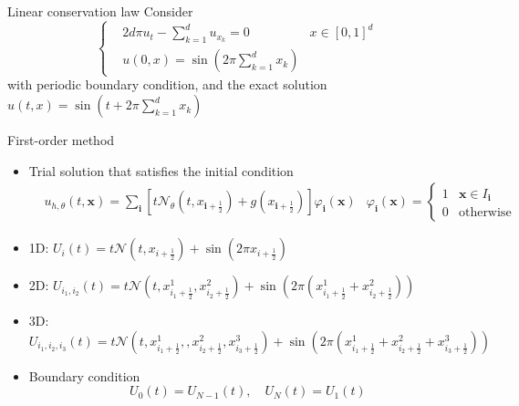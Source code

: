 \documentclass[aspectratio=169]{beamer}
\begin{document}
\begin{frame}{Linear conservation law}
 Consider 
 \begin{equation*}
 \left\{
 \begin{aligned}
 	 &2d\pi u_t - \sum_{k=1}^d u_{x_k} = 0 & x\in [0,1]^d\\
 	 &u(0,x) = \sin( 2 \pi \sum_{k=1}^d x_k)
 \end{aligned}\right.
 \end{equation*}
 with periodic boundary condition, and the exact solution  $u(t,x) = \sin(t + 2 \pi \sum_{k=1}^d x_k)$
  
\end{frame}
\begin{frame}{First-order method}
\begin{itemize}
	\item Trial solution that satisfies the initial condition
	\begin{equation*}
	\begin{aligned}
	&u_{h,\theta}(t,\boldsymbol{x}) = \sum_{\boldsymbol{i}} [t\mathcal{N}_\theta(t,x_{\boldsymbol{i}+\frac{1}{2}}) + g(x_{\boldsymbol{i}+\frac{1}{2}} )]\varphi_{\boldsymbol{i}}(\boldsymbol{x}) &
	\varphi_{\boldsymbol{i}}(\boldsymbol{x}) = \left\{\begin{matrix}
	1 & \boldsymbol{x} \in I_{\boldsymbol{i}}\\
	0 & \text{otherwise}
	\end{matrix}\right.
	\end{aligned}
	\end{equation*}
	\item 1D: $U_i(t) = t \mathcal{N}(t,x_{i+\frac{1}{2}}) + \sin(2\pi x_{i+\frac{1}{2}})$
	\item 2D: $U_{i_1,i_2}(t) = t \mathcal{N}(t,x^1_{i_1+\frac{1}{2}},x^2_{i_2+\frac{1}{2}}) + \sin(2\pi (x^1_{i_1+\frac{1}{2}}+x^2_{i_2+\frac{1}{2}} ) )$
	\item 3D: $U_{i_1,i_2,i_3}(t) = t \mathcal{N}(t,x^1_{i_1+\frac{1}{2}},,x^2_{i_2+\frac{1}{2}},x^3_{i_3+\frac{1}{2}}) + \sin(2\pi (x^1_{i_1+\frac{1}{2}}+x^2_{i_2+\frac{1}{2}} +x^3_{i_3+\frac{1}{2}} ) )$
	\item Boundary condition
	\begin{equation*}
	U_{0}(t) = U_{N-1}(t), \quad U_{N}(t)  = U_{1}(t)
	\end{equation*}
\end{itemize}  

\end{frame}
\end{document}
